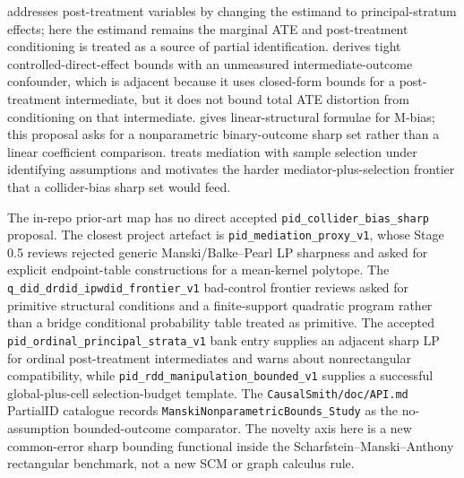 \documentclass[11pt]{article}
\theoremstyle{definition}
\theoremstyle{plain}
\theoremstyle{remark}
\begin{document}
\citet{FrangakisRubin2002PrincipalStratification} addresses post-treatment variables by changing the estimand to principal-stratum effects; here the estimand remains the marginal ATE and post-treatment conditioning is treated as a source of partial identification.  \citet{CaiKurokiPearlTian2008DirectEffects} derives tight controlled-direct-effect bounds with an unmeasured intermediate-outcome confounder, which is adjacent because it uses closed-form bounds for a post-treatment intermediate, but it does not bound total ATE distortion from conditioning on that intermediate.  \citet{DingMiratrix2015MBias} gives linear-structural formulae for M-bias; this proposal asks for a nonparametric binary-outcome sharp set rather than a linear coefficient comparison.  \citet{Huber2020DirectIndirectSelection} treats mediation with sample selection under identifying assumptions and motivates the harder mediator-plus-selection frontier that a collider-bias sharp set would feed.

The in-repo prior-art map has no direct accepted \texttt{pid\_collider\_bias\_sharp} proposal.  The closest project artefact is \texttt{pid\_mediation\_proxy\_v1}, whose Stage 0.5 reviews rejected generic Manski/Balke--Pearl LP sharpness and asked for explicit endpoint-table constructions for a mean-kernel polytope.  The \texttt{q\_did\_drdid\_ipwdid\_frontier\_v1} bad-control frontier reviews asked for primitive structural conditions and a finite-support quadratic program rather than a bridge conditional probability table treated as primitive.  The accepted \texttt{pid\_ordinal\_principal\_strata\_v1} bank entry supplies an adjacent sharp LP for ordinal post-treatment intermediates and warns about nonrectangular compatibility, while \texttt{pid\_rdd\_manipulation\_bounded\_v1} supplies a successful global-plus-cell selection-budget template.  The \texttt{CausalSmith/doc/API.md} PartialID catalogue records \texttt{ManskiNonparametricBounds\_Study} as the no-assumption bounded-outcome comparator.  The novelty axis here is a new common-error sharp bounding functional inside the Scharfstein--Manski--Anthony rectangular benchmark, not a new SCM or graph calculus rule.
\end{document}
